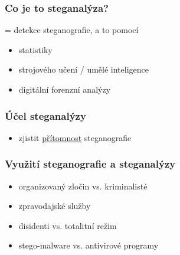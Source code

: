 \documentclass{beamer}
\begin{document}

\begin{frame}
\frametitle{Co je to steganalýza?}
= detekce steganografie, a to pomocí

\begin{itemize}
\item statistiky
\item strojového učení / umělé inteligence
\item digitální forenzní analýzy
\end{itemize}
\end{frame}


\begin{frame}
\frametitle{Účel steganalýzy}

\begin{itemize}
\item zjistit \underline{přítomnost} steganografie
\end{itemize}
\end{frame}

\begin{frame}
\frametitle{Využití steganografie a steganalýzy}

\begin{itemize}
\item organizovaný zločin vs. kriminalisté
\item<2-> zpravodajské služby
\item<3-> disidenti vs. totalitní režim
\item<4-> stego-malware vs. antivirové programy
\end{itemize}
\bigskip

\end{frame}
\end{document}
